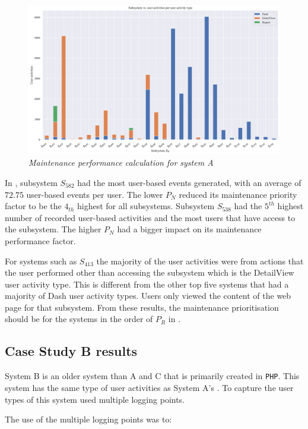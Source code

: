 \begin{figure}[!htb]
	\centering %
	\includegraphics[width=0.95\linewidth]{img/ch3/analysis/case_A_subsystems_1.pdf}
	\caption[Maintenance performance calculation for system A]
	{\textit{Maintenance performance calculation for system A}}\label{fig:ch3_caseAAnalysis}
\end{figure}

\par In , subsystem $S_{582}$ had the most user-based events generated, with an average of $72.75$ user-based events per user. The lower $P_N$ reduced its maintenance priority factor to be the $4_{th}$ highest for all subsystems. Subsystem $S_{538}$ had the $5^{th}$ highest number of recorded user-based activities and the most users that have access to the subsystem. The higher $P_N$ had a bigger impact on its maintenance performance factor.\par For systems such as $S_{413}$ the majority of the user activities were from actions that the user performed other than accessing the subsystem which is the DetailView user activity type. This is different from the other top five systems that had a majority of Dash user activity types. Users only viewed the content of the web page for that subsystem. From these results, the maintenance prioritisation should be for the systems in the order of $P_R$ in . 

\subsection{Case Study B results}\label{sec:ch3_csB}
System B is an older system than A and C that is primarily created in \texttt{PHP}. This system has the same type of user activities as System A's . To capture the user types of  this system used multiple logging points.\par The use of the multiple logging points was to:

